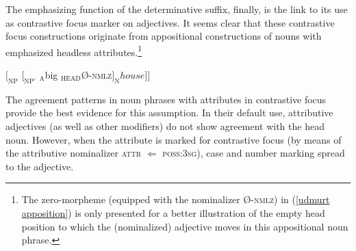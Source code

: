 The emphasizing function of the determinative suffix, finally, is the link to its use as contrastive focus marker on adjectives. It seems clear that these contrastive focus constructions originate from appositional constructions of nouns with emphasized headless attributes.\footnote{The zero-morpheme (equipped with the nominalizer Ø-\textsc{nmlz}) in (\ref{udmurt apposition}) is only presented for a better illustration of the empty head position to which the (nominalized) adjective moves in this appositional noun phrase.}
\begin{exe} \label{udmurt apposition}
\ex {\upshape [}\textsubscript{NP} {\upshape [}\textsubscript{NP'} \textsubscript{A}big \textsubscript{HEAD}Ø-\textsc{nmlz}{\upshape ]} \textsubscript{N}house{\upshape ]]}
\end{exe}
\begin{exe}
\ex $[_{\text{NP}}$ $[_{\text{NP'}}$ $_{\text{A}}$big $_{\text{HEAD}}$Ø-\textsc{nmlz}$] _{}house]]$
\end{exe}
The agreement patterns in noun phrases with attributes in contrastive focus provide the best evidence for this assumption. In their default use, attributive adjectives (as well as other modifiers) do not show agreement with the head noun. However, when the attribute is marked for contrastive focus (by means of the attributive nominalizer \textsc{attr} $\Leftarrow$ \textsc{poss:3sg}), case and number marking spread to the adjective.
